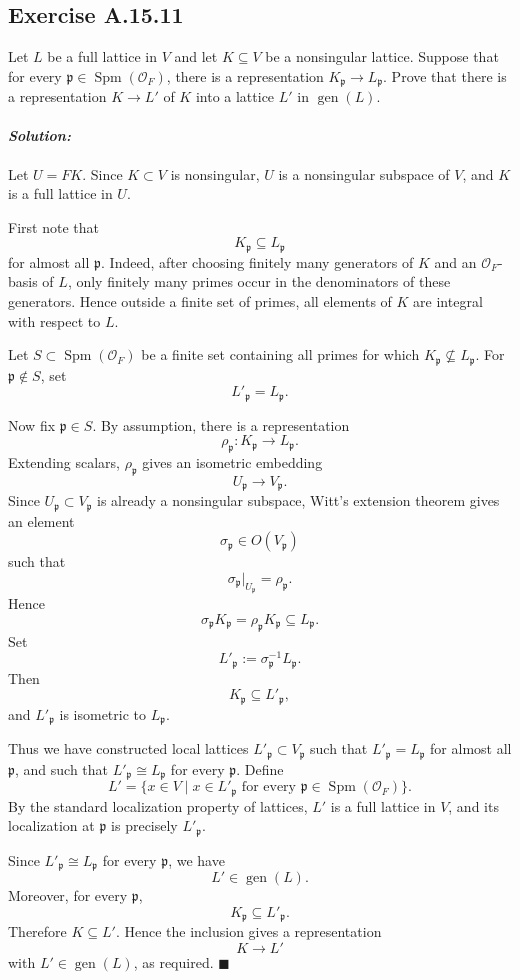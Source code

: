 \documentclass[12pt, a4paper]{article}
\newenvironment{solution}
  {\paragraph{\textit{Solution:}}\par\medskip}
  {\hfill$\blacksquare$\vspace{0.1cm}}
\begin{document}
\subsection*{Exercise A.15.11}
Let $L$ be a full lattice in $V$ and let $K \subseteq V$ be a nonsingular lattice. Suppose that for every $\mathfrak{p} \in \operatorname{Spm}(\mathcal{O}_F)$, there is a representation $K_{\mathfrak{p}} \to L_{\mathfrak{p}}$. Prove that there is a representation $K \to L'$ of $K$ into a lattice $L'$ in $\operatorname{gen}(L)$.
\begin{solution}
Let \(U=FK\). Since \(K\subset V\) is nonsingular, \(U\) is a nonsingular
subspace of \(V\), and \(K\) is a full lattice in \(U\).

First note that
\[
K_{\mathfrak p}\subseteq L_{\mathfrak p}
\]
for almost all \(\mathfrak p\). Indeed, after choosing finitely many generators
of \(K\) and an \(\mathcal O_F\)-basis of \(L\), only finitely many primes occur
in the denominators of these generators. Hence outside a finite set of primes,
all elements of \(K\) are integral with respect to \(L\).

Let \(S\subset \operatorname{Spm}(\mathcal O_F)\) be a finite set containing
all primes for which \(K_{\mathfrak p}\not\subseteq L_{\mathfrak p}\). For
\(\mathfrak p\notin S\), set
\[
L'_{\mathfrak p}=L_{\mathfrak p}.
\]

Now fix \(\mathfrak p\in S\). By assumption, there is a representation
\[
\rho_{\mathfrak p}:K_{\mathfrak p}\longrightarrow L_{\mathfrak p}.
\]
Extending scalars, \(\rho_{\mathfrak p}\) gives an isometric embedding
\[
U_{\mathfrak p}\longrightarrow V_{\mathfrak p}.
\]
Since \(U_{\mathfrak p}\subset V_{\mathfrak p}\) is already a nonsingular
subspace, Witt's extension theorem gives an element
\[
\sigma_{\mathfrak p}\in O(V_{\mathfrak p})
\]
such that
\[
\sigma_{\mathfrak p}|_{U_{\mathfrak p}}=\rho_{\mathfrak p}.
\]
Hence
\[
\sigma_{\mathfrak p}K_{\mathfrak p}
=
\rho_{\mathfrak p}K_{\mathfrak p}
\subseteq L_{\mathfrak p}.
\]
Set
\[
L'_{\mathfrak p}:=\sigma_{\mathfrak p}^{-1}L_{\mathfrak p}.
\]
Then
\[
K_{\mathfrak p}\subseteq L'_{\mathfrak p},
\]
and \(L'_{\mathfrak p}\) is isometric to \(L_{\mathfrak p}\).

Thus we have constructed local lattices \(L'_{\mathfrak p}\subset V_{\mathfrak p}\)
such that \(L'_{\mathfrak p}=L_{\mathfrak p}\) for almost all \(\mathfrak p\),
and such that \(L'_{\mathfrak p}\cong L_{\mathfrak p}\) for every
\(\mathfrak p\). Define
\[
L'=\{x\in V\mid x\in L'_{\mathfrak p}\text{ for every }
\mathfrak p\in\operatorname{Spm}(\mathcal O_F)\}.
\]
By the standard localization property of lattices, \(L'\) is a full lattice in
\(V\), and its localization at \(\mathfrak p\) is precisely
\(L'_{\mathfrak p}\).

Since \(L'_{\mathfrak p}\cong L_{\mathfrak p}\) for every \(\mathfrak p\), we
have
\[
L'\in \operatorname{gen}(L).
\]
Moreover, for every \(\mathfrak p\),
\[
K_{\mathfrak p}\subseteq L'_{\mathfrak p}.
\]
Therefore \(K\subseteq L'\). Hence the inclusion gives a representation
\[
K\longrightarrow L'
\]
with \(L'\in \operatorname{gen}(L)\), as required.
\end{solution}
\end{document}
